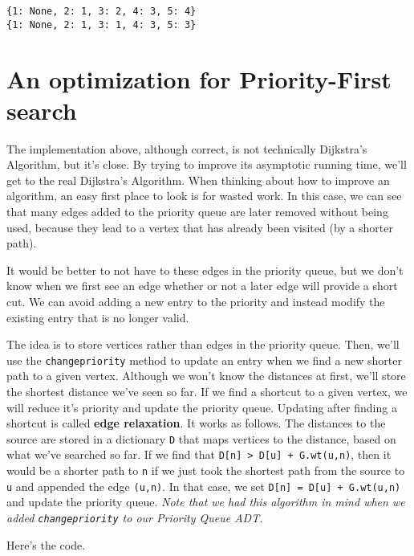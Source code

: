 \begin{Verbatim}
{1: None, 2: 1, 3: 2, 4: 3, 5: 4}
{1: None, 2: 1, 3: 1, 4: 3, 5: 3}
\end{Verbatim}

\section{An optimization for Priority-First search}


The implementation above, although correct, is not technically Dijkstra's Algorithm, but it's close.
By trying to improve its asymptotic running time, we'll get to the real Dijkstra's Algorithm.
When thinking about how to improve an algorithm, an easy first place to look is for wasted work.
In this case, we can see that many edges added to the priority queue are later removed without being used, because they lead to a vertex that has already been visited (by a shorter path).


It would be better to not have to these edges in the priority queue, but we don't know when we first see an edge whether or not a later edge will provide a short cut.
We can avoid adding a new entry to the priority and instead modify the existing entry that is no longer valid.


The idea is to store vertices rather than edges in the priority queue.
Then, we'll use the \texttt{changepriority} method to update an entry when we find a new shorter path to a given vertex.
Although we won't know the distances at first, we'll store the shortest distance we've seen so far.
If we find a shortcut to a given vertex, we will reduce it's priority and update the priority queue.
Updating after finding a shortcut is called \textbf{edge relaxation}.
It works as follows.
The distances to the source are stored in a dictionary \texttt{D} that maps vertices to the distance, based on what we've searched so far.
If we find that \texttt{D[n] > D[u] + G.wt(u,n)}, then it would be a shorter path to \texttt{n} if we just took the shortest path from the source to \texttt{u} and appended the edge \texttt{(u,n)}.  In that case, we set \texttt{D[n] = D[u] + G.wt(u,n)} and update the priority queue.
\emph{Note that we had this algorithm in mind when we added \texttt{changepriority} to our Priority Queue ADT.}


Here's the code.


